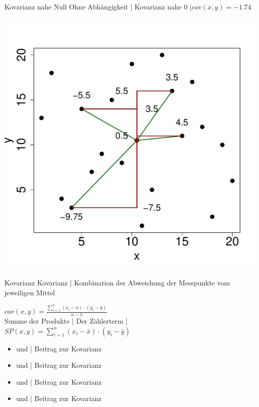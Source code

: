 \begin{frame}
  {Kovarianz nahe Null}
  Ohne Abhängigkeit | Kovarianz nahe 0 |$cov(x,y)=-1.74$\\
  \begin{center}
    \includegraphics[height=0.7\textheight]{graphics/cov09}
  \end{center}
\end{frame}

\begin{frame}
  {Kovarianz}
  \alert{Kovarianz} | Kombination der Abweichung der Messpunkte vom jeweiligen Mittel\\
  \begin{center}
    \alert{$cov(x,y)=\frac{\sum\limits_{i=1}^{n}(x_i-\bar{x})\cdot(y_i-\bar{y})}{n-1}$}\\
    \Halbzeile
    \alert{Summe der Produkte} | Der Zählerterm | $SP(x,y)=\sum\limits_{i=1}^{n}(x_i-\bar{x})\cdot(y_i-\bar{y})$
  \end{center}
  \Halbzeile
  \begin{itemize}[<+->]
    \item {} und  | Beitrag zur Kovarianz 
    \item {} und  | Beitrag zur Kovarianz 
      \Halbzeile
    \item {} und  | Beitrag zur Kovarianz 
    \item {} und  | Beitrag zur Kovarianz 
  \end{itemize}
\end{frame}



